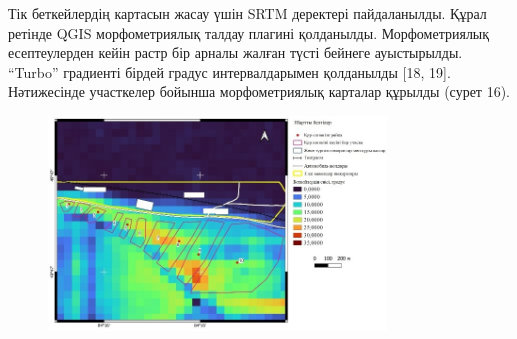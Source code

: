 
Тік беткейлердің картасын жасау үшін SRTM деректері пайдаланылды. Құрал
ретінде QGIS морфометриялық талдау плагині қолданылды. Морфометриялық
есептеулерден кейін растр бір арналы жалған түсті бейнеге ауыстырылды.
``Turbo'' градиенті бірдей градус интервалдарымен қолданылды {[}18,
19{]}. Нәтижесінде участкелер бойынша морфометриялық карталар құрылды
(сурет 16).

\begin{figure}[H]
	\centering
	\includegraphics[width=0.8\textwidth]{media/ict2/image219}
	\caption*{}
\end{figure}

